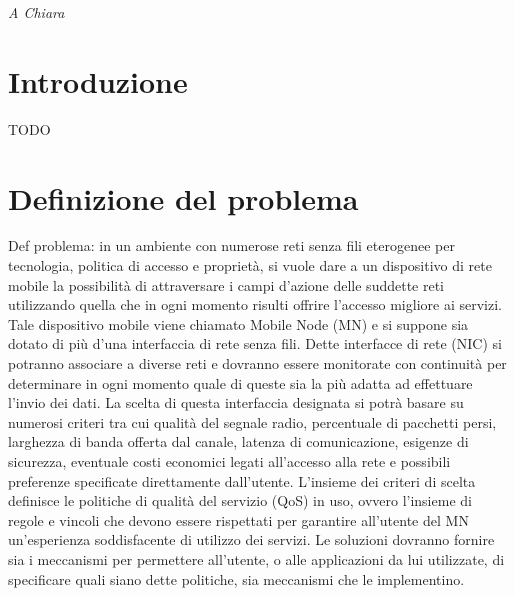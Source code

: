 \documentclass[12pt,a4paper,openright,twoside]{book}
\begin{document}
%
%
\begin{titlepage}
  \thispagestyle{empty}
  \topmargin=6.5cm
  \raggedleft
  \large
  \em A Chiara
  \newpage
  \clearpage{\pagestyle{empty}\cleardoublepage}
\end{titlepage}



\chapter*{Introduzione}

TODO

\clearpage{\pagestyle{empty}\cleardoublepage}

\tableofcontents
\rhead[\fancyplain{}{\bfseries\leftmark}]{\fancyplain{}{\bfseries\thepage}}
\clearpage{\pagestyle{empty}\cleardoublepage}

\chapter{Definizione del problema}

Def problema: in un ambiente con numerose reti senza fili eterogenee
per tecnologia, politica di accesso e proprietà, si vuole dare a un
dispositivo di rete mobile la possibilità di attraversare i campi
d'azione delle suddette reti utilizzando quella che in ogni momento
risulti offrire l'accesso migliore ai servizi. Tale dispositivo mobile
viene chiamato Mobile Node (MN) e si suppone sia dotato di più d'una
interfaccia di rete senza fili. Dette interfacce di rete (NIC) si
potranno associare a diverse reti e dovranno essere monitorate con
continuità per determinare in ogni momento quale di queste sia la più
adatta ad effettuare l'invio dei dati. La scelta di questa interfaccia
designata si potrà basare su numerosi criteri tra cui qualità del
segnale radio, percentuale di pacchetti persi, larghezza di banda
offerta dal canale, latenza di comunicazione, esigenze di sicurezza,
eventuale costi economici legati all'accesso alla rete e possibili
preferenze specificate direttamente dall'utente. L'insieme dei criteri
di scelta definisce le politiche di qualità del servizio (QoS) in uso,
ovvero l'insieme di regole e vincoli che devono essere rispettati per
garantire all'utente del MN un'esperienza soddisfacente di utilizzo
dei servizi. Le soluzioni dovranno fornire sia i meccanismi per
permettere all'utente, o alle applicazioni da lui utilizzate, di
specificare quali siano dette politiche, sia meccanismi che le
implementino.
\end{document}
